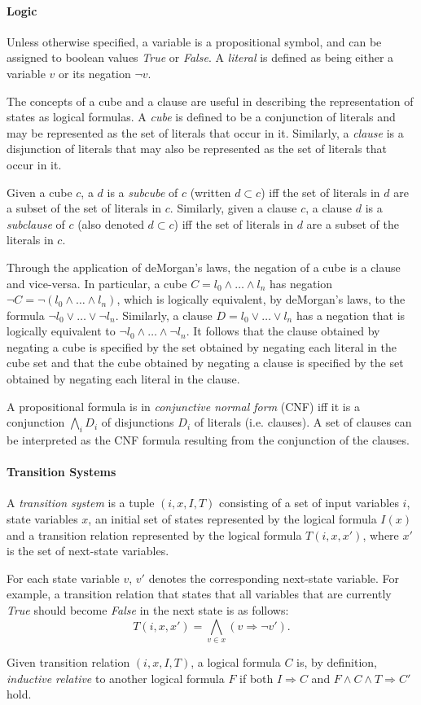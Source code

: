 \documentclass[12pt,a4paper,twoside,openright]{report}
\begin{document}
\paragraph{Logic}{
Unless otherwise specified, a variable is a propositional symbol,
and can be assigned to boolean values {\it True} or {\it False}.
A \emph{literal} is defined as being either a variable $v$ or its negation $\neg v$.

The concepts of a cube and a clause are useful in describing the
representation of states as logical formulas.
A \emph{cube} is defined to be a conjunction of literals and may be represented as the set
of literals that occur in it. Similarly, a \emph{clause} is a disjunction of literals that
may also be represented as the set of literals that occur in it.

Given a cube $c$, a $d$ is a \emph{subcube} of $c$ (written $d \subset c$)
iff the set of literals in $d$ are a subset of the set of literals in $c$.
Similarly, given a clause $c$, a clause $d$ is a \emph{subclause} of $c$ (also
denoted $d \subset c$) iff the set of literals in $d$ are a subset of
the literals in $c$.

Through the application of deMorgan's laws, the negation of a cube is a clause and
vice-versa. In particular, a cube $C = l_0 \wedge \ldots \wedge l_n$ has negation
$\neg C = \neg (l_0 \wedge \ldots \wedge l_n)$, which is logically equivalent,
by deMorgan's laws, to the formula $\neg l_0 \vee \ldots \vee \neg l_n$.
Similarly, a clause $D = l_0 \vee \ldots \vee l_n$ has a negation that is
logically equivalent to $\neg l_0 \wedge \ldots \wedge \neg l_n$. It follows
that the clause obtained by negating a cube is specified by the set obtained
by negating each literal in the cube set and that the cube obtained by negating
a clause is specified by the set obtained by negating each literal in the clause.

A propositional formula is in \emph{conjunctive normal form} (CNF) iff it is a conjunction 
$\bigwedge_i D_i$ of disjunctions $D_i$ of literals (i.e. clauses). A set of clauses
can be interpreted as the CNF formula resulting from the conjunction
of the clauses.}

\paragraph{Transition Systems}{
A \emph{transition system} is a tuple $(i,x,I,T)$ consisting of a set of input
variables $i$, state variables $x$, an initial
set of states represented by the logical formula $I(x)$ and
a transition relation represented by the logical formula $T(i,x,x')$,
where $x'$ is the set of next-state variables.

For each state variable $v$, $v'$ denotes the corresponding next-state variable.
For example, a transition relation that states that all variables that are
currently {\it True} should become {\it False} in the next state is as follows:
$$T(i,x,x') = \bigwedge_{v \in x} (v \Rightarrow \neg v').$$

Given transition relation $(i,x,I,T)$, a logical formula $C$ is, by definition,
\emph{inductive relative} to another logical formula $F$ if both
$I \Rightarrow C$ and $F \wedge C \wedge T \Rightarrow C'$ hold.
}
\end{document}
